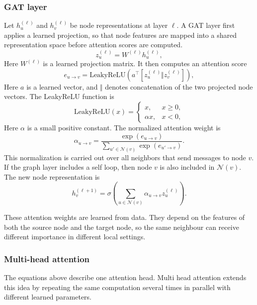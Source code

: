 \subsubsection{GAT layer}
\noindent Let $h_{u}^{(\ell)}$ and $h_{v}^{(\ell)}$ be node representations at layer $\ell$. A GAT layer first applies a learned projection, so that node features are mapped into a shared representation space before attention scores are computed.
\begin{equation}
z_{u}^{(\ell)} = W^{(\ell)} h_{u}^{(\ell)},
\end{equation}
Here $W^{(\ell)}$ is a learned projection matrix. It then computes an attention score
\begin{equation}
e_{u \rightarrow v}=\mathrm{LeakyReLU}\!\left(a^{\top}\left[z_{u}^{(\ell)} \Vert z_{v}^{(\ell)}\right]\right),
\end{equation}
Here $a$ is a learned vector, and $\Vert$ denotes concatenation of the two projected node vectors. The LeakyReLU function is
\begin{equation}
\mathrm{LeakyReLU}(x)=
\begin{cases}
x, & x \ge 0, \\
\alpha x, & x < 0,
\end{cases}
\end{equation}
Here $\alpha$ is a small positive constant. The normalized attention weight is
\begin{equation}
\alpha_{u \rightarrow v}=
\frac{\exp(e_{u \rightarrow v})}
{\sum_{u' \in \mathcal{N}(v)} \exp(e_{u' \rightarrow v})}.
\end{equation}
This normalization is carried out over all neighbors that send messages to node $v$. If the graph layer includes a self loop, then node $v$ is also included in $\mathcal{N}(v)$.
The new node representation is
\begin{equation}
h_{v}^{(\ell+1)}=\sigma\!\left(\sum_{u \in \mathcal{N}(v)} \alpha_{u \rightarrow v} z_{u}^{(\ell)}\right).
\end{equation}

\noindent These attention weights are learned from data. They depend on the features of both the source node and the target node, so the same neighbour can receive different importance in different local settings.

\subsubsection{Multi-head attention}
\noindent The equations above describe one attention head. Multi head attention extends this idea by repeating the same computation several times in parallel with different learned parameters.

